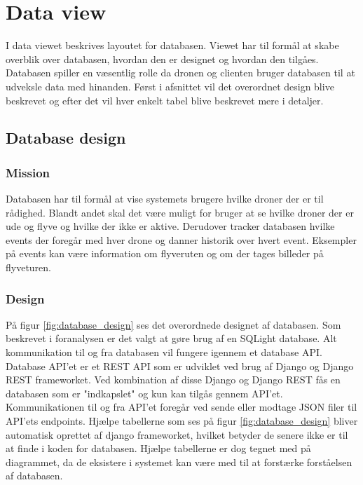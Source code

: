 \section{Data view}
\label{ref:dataView}

I data viewet beskrives layoutet for databasen. Viewet har til formål at skabe overblik over databasen, hvordan den er designet og hvordan den tilgåes. Databasen spiller en væsentlig rolle da dronen og clienten bruger databasen til at udveksle data med hinanden. Først i afsnittet vil det overordnet design blive beskrevet og efter det vil hver enkelt tabel blive beskrevet mere i detaljer. 

\subsection{Database design}

\subsubsection*{Mission}
Databasen har til formål at vise systemets brugere hvilke droner der er til rådighed. Blandt andet skal det være muligt for bruger at se hvilke droner der er ude og flyve og hvilke der ikke er aktive. Derudover tracker databasen hvilke events der foregår med hver drone og danner historik over hvert event. Eksempler på events kan være information om flyveruten og om der tages billeder på flyveturen.

\subsubsection*{Design}
På figur \ref{fig:database_design} ses det overordnede designet af databasen. Som beskrevet i foranalysen er det valgt at gøre brug af en SQLight database. Alt kommunikation til og fra databasen vil fungere igennem et database API. Database API'et er et REST API som er udviklet ved brug af Django og Django REST frameworket. Ved kombination af disse Django og Django REST fås en databasen som er "indkapslet" og kun kan tilgås gennem API'et. Kommunikationen til og fra API'et foregår ved sende eller modtage JSON filer til API'ets endpoints. Hjælpe tabellerne som ses på figur \ref{fig:database_design} bliver automatisk oprettet af django frameworket, hvilket betyder de senere ikke er til at finde i koden for databasen. Hjælpe tabellerne er dog tegnet med på diagrammet, da de eksistere i systemet kan være med til at forstærke forståelsen af databasen. 


